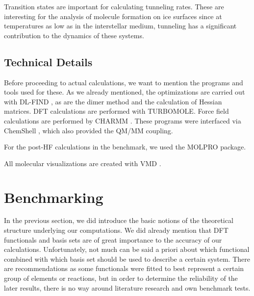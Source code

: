 \documentclass[8.5pt,twoside,twocolumn]{article}
\theoremstyle{standard}
\begin{document}
Transition states are important for calculating tunneling rates. These are interesting
for the analysis of molecule formation on ice surfaces since at temperatures as low
as in the interstellar medium, tunneling has a significant contribution to the dynamics of 
these systems.

\subsection{Technical Details}

Before proceeding to actual calculations, we want to mention the programs and tools 
used for these. As we already mentioned, the optimizations are carried out with
DL-FIND \cite{Kaestner2009}, as are the dimer method and the calculation of 
Hessian matrices. DFT calculations are performed with TURBOMOLE\cite{TURBOMOLE}.
Force field calculations are performed by CHARMM \cite{CHARMM2009}. These programs were interfaced
via ChemShell \cite{chemshell}, which also provided the QM/MM coupling.

For the post-HF calculations in the benchmark, we used the MOLPRO \cite{MOLPRO_brief}
package.

All molecular visualizations are created with VMD \cite{HUMP96}.



\section{Benchmarking}
\newcommand\htohto{\enmat{\hto-\hto}}
\newcommand\htoh{\enmat{\hto-\te H}}
\label{Sec:Bench}

In the previous section, we did introduce the basic notions of the theoretical structure underlying our
computations. We did already mention that DFT functionals and basis sets are of great importance
to the accuracy of our calculations. Unfortunately, not much can be said a priori about
which functional combined with which basis set should be used to describe a certain system.
There are recommendations as some functionals were fitted to best represent a certain
group of elements or reactions, but in order to determine the reliability of the
later results, there is no way around literature research and own benchmark tests.
\end{document}
